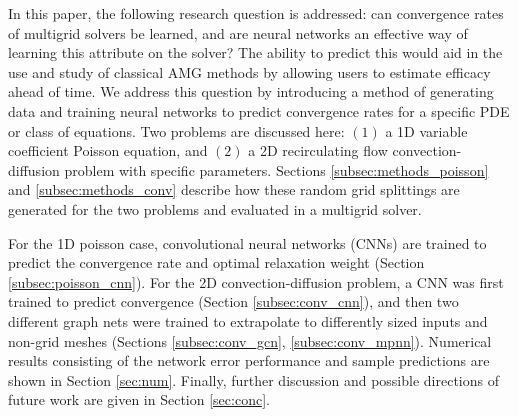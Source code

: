 \documentclass{siamart190516}
\begin{document}
In this paper, the following research question is addressed: can convergence rates of multigrid solvers be learned, and are neural networks an effective way of learning this attribute on the solver?  The ability to predict this would aid in the use and study of classical AMG methods by allowing users to estimate efficacy ahead of time.  We address this question by introducing a method of generating data and training neural networks to predict convergence rates for a specific PDE or class of equations.  Two problems are discussed here: $(1)$ a 1D variable coefficient Poisson equation, and $(2)$ a 2D recirculating flow convection-diffusion problem with specific parameters.  Sections \ref{subsec:methods_poisson} and \ref{subsec:methods_conv} describe how these random grid splittings are generated for the two problems and evaluated in a multigrid solver.

For the 1D poisson case, convolutional neural networks (CNNs) are trained to predict the convergence rate and optimal relaxation weight (Section \ref{subsec:poisson_cnn}).  For the 2D convection-diffusion problem, a CNN was first trained to predict convergence (Section \ref{subsec:conv_cnn}), and then two different graph nets were trained to extrapolate to differently sized inputs and non-grid meshes (Sections \ref{subsec:conv_gcn}, \ref{subsec:conv_mpnn}).  Numerical results consisting of the network error performance and sample predictions are shown in Section \ref{sec:num}.  Finally, further discussion and possible directions of future work are given in Section \ref{sec:conc}.


\end{document}
